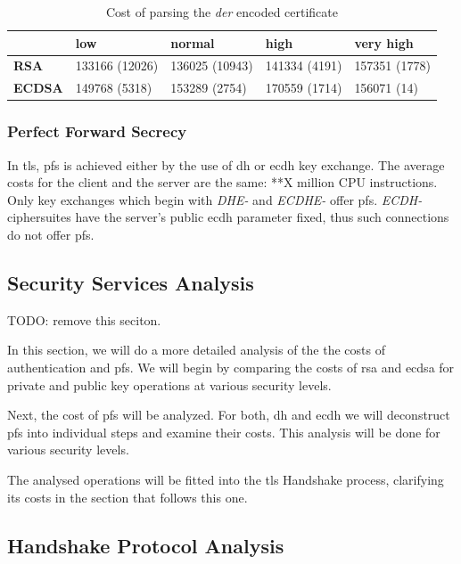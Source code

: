 \documentclass{llncs}
\begin{document}
\begin{table}[]
\label{table:cert-parse-cost}
\begin{tabular}{|l|l|l|l|l|}
\hline
               & \textbf{low}   & \textbf{normal} & \textbf{high} & \textbf{very high} \\ \hline
\textbf{RSA}   & 133166 (12026) & 136025 (10943)  & 141334 (4191) & 157351 (1778)      \\ \hline
\textbf{ECDSA} & 149768 (5318)  & 153289 (2754)   & 170559 (1714) & 156071 (14)        \\ \hline
\end{tabular}
\caption{Cost of parsing the \textit{der} encoded certificate}
\end{table}

\subsubsection{Perfect Forward Secrecy}

In \gls{tls}, \gls{pfs} is achieved either by the use of \gls{dh} or \gls{ecdh} key exchange. The average costs for the
client and the server are the same: **X million CPU instructions. Only key exchanges which begin with \textit{DHE-} and
\textit{ECDHE-} offer \gls{pfs}. \textit{ECDH-} ciphersuites have the server's public \gls{ecdh} parameter fixed, thus
such connections do not offer \gls{pfs}.

\subsection{Security Services Analysis}

TODO: remove this seciton.

In this section, we will do a more detailed analysis of the the costs of authentication and \gls{pfs}.
We will begin by comparing the costs of \gls{rsa} and \gls{ecdsa} for private and public key operations at various
security levels. 

Next, the cost of \gls{pfs} will be analyzed. For both, \gls{dh} and \gls{ecdh} we will deconstruct \gls{pfs} into 
individual steps and examine their costs. This analysis will be done for various security levels. 

The analysed operations will be fitted into the \gls{tls} Handshake process, clarifying its costs in the section that
follows this one.




\subsection{Handshake Protocol Analysis}
\end{document}
